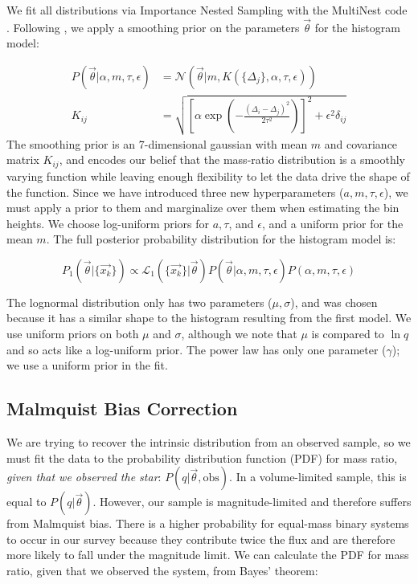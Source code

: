 We fit all distributions via Importance Nested Sampling with the MultiNest code \citep{multinest}. Following \citet{Foreman2014}, we apply a smoothing prior on the parameters $\vec{\theta}$ for the histogram model:

\begin{align}
P(\vec{\theta}| \alpha, m, \tau, \epsilon) &= \mathcal{N}(\vec{\theta} | m, K(\{\Delta_j\}, \alpha, \tau, \epsilon)) \\
K_{ij} &= \sqrt{\left[\alpha \exp{\left(-\frac{(\Delta_i - \Delta_j)^2}{2\tau^2}\right)}\right]^2 + \epsilon^2 \delta_{ij}}
\end{align}
The smoothing prior is an 7-dimensional gaussian with mean $m$ and covariance matrix $K_{ij}$, and encodes our belief that the mass-ratio distribution is a smoothly varying function while leaving enough flexibility to let the data drive the shape of the function. Since we have introduced three new hyperparameters ($a, m, \tau, \epsilon$), we must apply a prior to them and marginalize over them when estimating the bin heights. We choose log-uniform priors for $a, \tau$, and $\epsilon$, and a uniform prior for the mean $m$. The full posterior probability distribution for the histogram model is:

\begin{equation}
P_1(\vec{\theta} | \{\vec{x_k}\}) \propto \mathcal{L}_1(\{\vec{x_k}\}| \vec{\theta}) P(\vec{\theta}| \alpha, m, \tau, \epsilon) P(\alpha, m, \tau, \epsilon)
\end{equation}

The lognormal distribution only has two parameters ($\mu, \sigma$), and was chosen because it has a similar shape to the histogram resulting from the first model. We use uniform priors on both $\mu$ and $\sigma$, although we note that $\mu$ is compared to $\ln{q}$ and so acts like a log-uniform prior. The power law has only one parameter ($\gamma$); we use a uniform prior in the fit.

\subsection{Malmquist Bias Correction}

We are trying to recover the intrinsic distribution from an observed sample, so we must fit the data to the probability distribution function (PDF) for mass ratio, \emph{given that we observed the star}: $P(q|\vec{\theta}, \mathrm{obs})$. In a volume-limited sample, this is equal to $P(q|\vec{\theta})$. However, our sample is magnitude-limited and therefore suffers from Malmquist bias. There is a higher probability for equal-mass binary systems to occur in our survey because they contribute twice the flux and are therefore more likely to fall under the magnitude limit. We can calculate the PDF for mass ratio, given that we observed the system, from Bayes' theorem:

